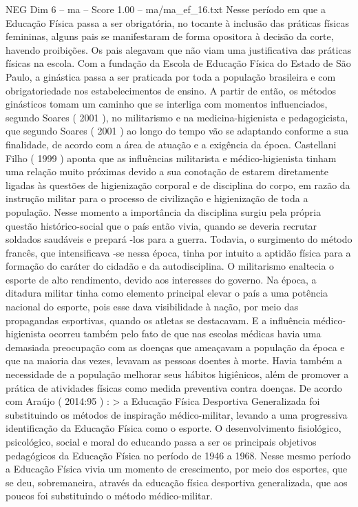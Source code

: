 \begin{textsample}{NEG Dim 6 – ma – Score 1.00 – ma/ma\_ef\_16.txt}
Nesse período em que a Educação Física passa a ser obrigatória, no tocante à inclusão das práticas físicas femininas, alguns pais se manifestaram de forma opositora à decisão da corte, havendo proibições.
Os pais alegavam que não viam uma justificativa das práticas físicas na escola.
Com a fundação da Escola de Educação Física do Estado de São Paulo, a ginástica passa a ser praticada por toda a população brasileira e com obrigatoriedade nos estabelecimentos de ensino.
A partir de então, os métodos ginásticos tomam um caminho que se interliga com momentos influenciados, segundo Soares ( 2001 ), no militarismo e na medicina-higienista e pedagogicista, que segundo Soares ( 2001 ) ao longo do tempo vão se adaptando conforme a sua finalidade, de acordo com a área de atuação e a exigência da época.
Castellani Filho ( 1999 ) aponta que as influências militarista e médico-higienista tinham uma relação muito próximas devido a sua conotação de estarem diretamente ligadas às questões de higienização corporal e de disciplina do corpo, em razão da instrução militar para o processo de civilização e higienização de toda a população.
Nesse momento a importância da disciplina surgiu pela própria questão histórico-social que o país então vivia, quando se deveria recrutar soldados saudáveis e prepará -los para a guerra.
Todavia, o surgimento do método francês, que intensificava -se nessa época, tinha por intuito a aptidão física para a formação do caráter do cidadão e da autodisciplina.
O militarismo enaltecia o esporte de alto rendimento, devido aos interesses do governo.
Na época, a ditadura militar tinha como elemento principal elevar o país a uma potência nacional do esporte, pois esse dava visibilidade à nação, por meio das propagandas esportivas, quando os atletas se destacavam.
E a influência médico-higienista ocorreu também pelo fato de que nas escolas médicas havia uma demasiada preocupação com as doenças que ameaçavam a população da época e que na maioria das vezes, levavam as pessoas doentes à morte.
Havia também a necessidade de a população melhorar seus hábitos higiênicos, além de promover a prática de atividades físicas como medida preventiva contra doenças.
De acordo com Araújo ( 2014:95 ) : > a Educação Física Desportiva Generalizada foi substituindo os métodos de inspiração médico-militar, levando a uma progressiva identificação da Educação Física como o esporte.
O desenvolvimento fisiológico, psicológico, social e moral do educando passa a ser os principais objetivos pedagógicos da Educação Física no período de 1946 a 1968.
Nesse mesmo período a Educação Física vivia um momento de crescimento, por meio dos esportes, que se deu, sobremaneira, através da educação física desportiva generalizada, que aos poucos foi substituindo o método médico-militar.

\end{textsample}
